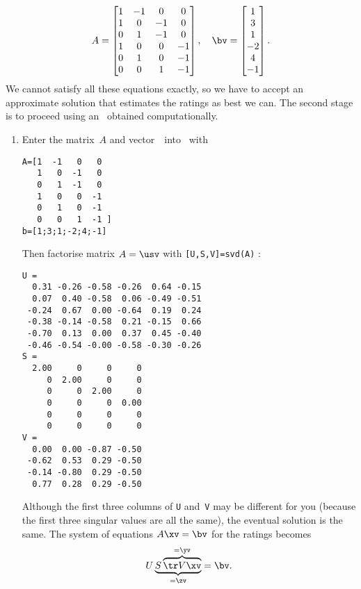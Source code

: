 \begin{example}
\begin{solution}
\begin{equation*}
A=\begin{bmatrix}    1 & -1 & 0 & 0
\\ 1 & 0 & -1 & 0
\\ 0 & 1 & -1 & 0
\\ 1 & 0 & 0 & -1
\\ 0 & 1 & 0 & -1
\\ 0 & 0 & 1 & -1
 \end{bmatrix},\quad
 \bv=\begin{bmatrix} 1\\ 3\\ 1\\ -2\\ 4\\ -1 \end{bmatrix}.
\end{equation*}
We cannot satisfy all these equations exactly, so we have to accept an approximate solution that estimates the ratings as best we can.
The second stage is to proceed using an \svd\ obtained computationally.
\begin{enumerate}
\item Enter the matrix~\(A\) and vector~\bv\ into \script\ with
\setbox\ajrqrbox\hbox{}%
\marginpar{\usebox{\ajrqrbox\\[2ex]}}%
\begin{verbatim}
A=[1  -1   0   0
   1   0  -1   0
   0   1  -1   0
   1   0   0  -1
   0   1   0  -1
   0   0   1  -1 ]
b=[1;3;1;-2;4;-1]
\end{verbatim}
Then factorise  matrix \(A=\usv\) with \verb|[U,S,V]=svd(A)| \twodp:
\begin{verbatim}
U =
  0.31 -0.26 -0.58 -0.26  0.64 -0.15
  0.07  0.40 -0.58  0.06 -0.49 -0.51
 -0.24  0.67  0.00 -0.64  0.19  0.24
 -0.38 -0.14 -0.58  0.21 -0.15  0.66
 -0.70  0.13  0.00  0.37  0.45 -0.40
 -0.46 -0.54 -0.00 -0.58 -0.30 -0.26
S =
  2.00     0     0     0
     0  2.00     0     0
     0     0  2.00     0
     0     0     0  0.00
     0     0     0     0
     0     0     0     0
V =
  0.00  0.00 -0.87 -0.50
 -0.62  0.53  0.29 -0.50
 -0.14 -0.80  0.29 -0.50
  0.77  0.28  0.29 -0.50
\end{verbatim}
Although the first three columns of \verb|U| and~\verb|V| may be different for you (because the first three singular values are all the same),  the eventual solution is the same.
The system of equations \(A\xv=\bv\) for the ratings becomes
\begin{equation*}
U\underbrace{S\overbrace{\tr V\xv}^{=\yv}}_{=\zv}
=\bv.
\end{equation*}


\end{enumerate}
\end{solution}
\end{example}
